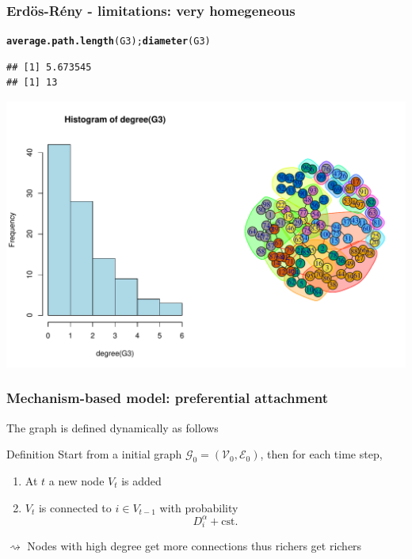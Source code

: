 \documentclass{beamer}\usepackage[]{graphicx}\usepackage[]{color}
\makeatletter
\newcommand{\hlstd}[1]{\textcolor[rgb]{0.345,0.345,0.345}{#1}}%
\newcommand{\hlkwd}[1]{\textcolor[rgb]{0.737,0.353,0.396}{\textbf{#1}}}%
\newenvironment{kframe}{%
 \def\at@end@of@kframe{}%
 \ifinner\ifhmode%
  \def\at@end@of@kframe{\end{minipage}}%
  \begin{minipage}{\columnwidth}%
 \fi\fi%
 \def\FrameCommand##1{\hskip\@totalleftmargin \hskip-\fboxsep
 \colorbox{shadecolor}{##1}\hskip-\fboxsep
     \hskip-\linewidth \hskip-\@totalleftmargin \hskip\columnwidth}%
 \MakeFramed {\advance\hsize-\width
   \@totalleftmargin\z@ \linewidth\hsize
   \@setminipage}}%
 {\par\unskip\endMakeFramed%
 \at@end@of@kframe}
\newenvironment{knitrout}{}{} %
\makeatother
\begin{document}
\begin{frame}[fragile]
  \frametitle{Erdös-Rény - limitations: very homegeneous}

\begin{knitrout}\scriptsize
{}\color{fgcolor}\begin{kframe}
\begin{alltt}
\hlkwd{average.path.length}\hlstd{(G3);} \hlkwd{diameter}\hlstd{(G3)}
\end{alltt}
\begin{verbatim}
## [1] 5.673545
## [1] 13
\end{verbatim}
\end{kframe}
\end{knitrout}

\begin{knitrout}\scriptsize
{}\color{fgcolor}
\includegraphics[width=.8\textwidth]{figures/ER_limitation2-1} 

\end{knitrout}
\end{frame}

\begin{frame}
  \frametitle{Mechanism-based model: preferential attachment}

  The graph is defined dynamically as follows
  \begin{block}{Definition}
    Start from a initial graph $\mathcal{G}_0 = (\mathcal{V}_0,\mathcal{E}_0)$, then for each time step,
    \begin{enumerate}
      \item At $t$ a new node $V_t$ is added
      \item $V_t$ is connected to $i \in V_{t-1}$ with probability
      \begin{equation*}
        D_i^\alpha + \mathrm{cst.}
      \end{equation*}
    \end{enumerate}
  \end{block}
  $\rightsquigarrow$ Nodes with high degree get more connections thus \alert{richers get richers}
\end{frame}
\end{document}
